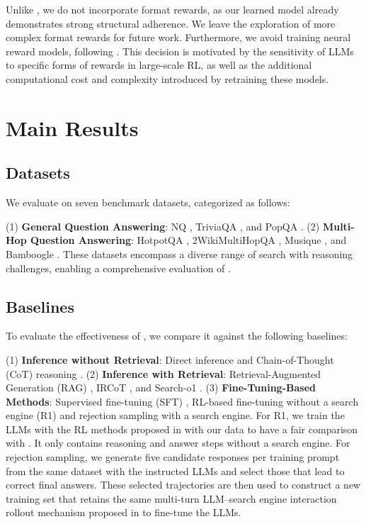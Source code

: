 Unlike \cite{guo2025deepseek}, we do not incorporate format rewards, as our learned model already demonstrates strong structural adherence. We leave the exploration of more complex format rewards for future work. Furthermore, we avoid training neural reward models, following \cite{guo2025deepseek}. This decision is motivated by the sensitivity of LLMs to specific forms of rewards in large-scale RL, as well as the additional computational cost and complexity introduced by retraining these models.

\section{Main Results}

\subsection{Datasets}

We evaluate \Ours on seven benchmark datasets, categorized as follows:

(1) \textbf{General Question Answering}: NQ \citep{kwiatkowski2019natural}, TriviaQA \citep{joshi2017triviaqa}, and PopQA \citep{mallen2022not}.
(2) \textbf{Multi-Hop Question Answering}: HotpotQA \citep{yang2018hotpotqa}, 2WikiMultiHopQA \citep{ho2020constructing}, Musique \citep{trivedi2022musique}, and Bamboogle \citep{press2022measuring}.
These datasets encompass a diverse range of search with reasoning challenges, enabling a comprehensive evaluation of \Ours. 

\subsection{Baselines}

To evaluate the effectiveness of \Ours, we compare it against the following baselines:

(1) \textbf{Inference without Retrieval}: Direct inference and Chain-of-Thought (CoT) reasoning \citep{wei2022chain}.
(2) \textbf{Inference with Retrieval}: Retrieval-Augmented Generation (RAG) \citep{lewis2020retrieval}, IRCoT \citep{trivedi2022interleaving}, and Search-o1 \citep{li2025search}.
(3) \textbf{Fine-Tuning-Based Methods}: Supervised fine-tuning (SFT) \citep{chung2024scaling}, RL-based fine-tuning without a search engine (R1) \citep{guo2025deepseek} and rejection sampling \citep{ahn2024large} with a search engine. 
For R1, we train the LLMs with the RL methods proposed in \cite{guo2025deepseek} with our data to have a fair comparison with \Ours. It only contains reasoning and answer steps without a search engine.
For rejection sampling, we generate five candidate responses per training prompt from the same dataset with the instructed LLMs and select those that lead to correct final answers. These selected trajectories are then used to construct a new training set that retains the same multi-turn LLM–search engine interaction rollout mechanism proposed in \Ours to fine-tune the LLMs.

